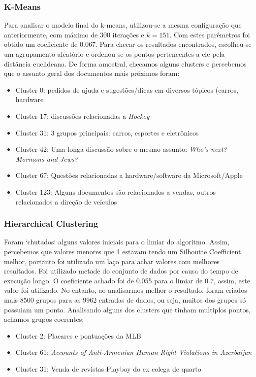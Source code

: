 \documentclass[conference]{IEEEtran}
\begin{document}
\subsubsection{K-Means}
Para analisar o modelo final do k-means, utilizou-se a mesma configuração que anteriormente, com máximo de 300 iterações e $k=151$. Com estes parêmetros foi obtido um coeficiente de 0.067. Para checar os resultados encontrados, escolheu-se um agrupamento aleatório e ordenou-se os pontos pertencentes a ele pela distância euclideana. De forma amostral, checamos alguns clusters e percebemos que o assunto geral dos documentos mais próximos foram:

\begin{itemize}
\item Cluster 0: pedidos de ajuda e sugestões/dicas em diversos tópicos (carros, hardware
\item Cluster 17: discussões relacionadas a \textit{Hockey}
\item Cluster 31: 3 grupos principais: carros, esportes e eletrônicos
\item Cluster 42: Uma longa discussão sobre o mesmo assunto: \textit{Who's next? Mormons and Jews?}
\item Cluster 67: Questões relacionadas a hardware/software da Microsoft/Apple
\item Cluster 123: Alguns documentos são relacionados a vendas, outros relacionados a direção de veículos
\end{itemize}

\subsubsection{Hierarchical Clustering}
Foram `chutados`  alguns valores iniciais para o limiar do algoritmo. Assim, percebemos que valores menores que 1 estavam tendo um Silhoutte Coefficient melhor, portanto foi utilizado um laço para achar valores com melhores resultados. Foi utilizado metade do conjunto de dados por causa do tempo de execução longo. O coeficiente achado foi de 0.055 para o limiar de 0.7, assim, este valor foi utilizado.
No entanto, ao analisarmos melhor o resultado, foram criados mais 8500 grupos para as 9962 entradas de dados, ou seja, muitos dos grupos só possuiam um ponto. Analisando alguns dos clusters que tinham multiplos pontos, achamos grupos coerentes:

\begin{itemize}
\item Cluster 2: Placares e pontuações da MLB
\item Cluster 61: \textit{Accounts of Anti-Armenian Human Right Violations in Azerbaijan}
\item Cluster 31: Venda de revistas Playboy do ex colega de quarto
\end{itemize}
\end{document}
